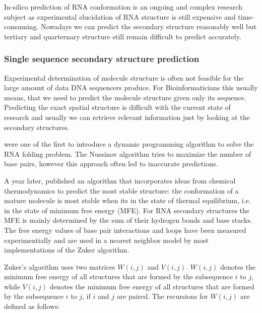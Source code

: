 In-silico prediction of RNA conformation is an ongoing and complex research subject as experimental elucidation of RNA structure is still expensive and time-consuming. Nowadays we can predict the secondary structure reasonably well but tertiary and quarternary structure still remain difficult to predict accurately.

\subsubsection{Single sequence secondary structure prediction}
Experimental determination of molecule structure is often not feasible for the large amount of data DNA sequencers produce. For Bioinformaticians
this usually means, that we need to predict the molecule structure given only its sequence. Predicting the exact spatial structure is difficult with the current state of research and usually we can retrieve relevant information just by looking at the secondary structures. 

\citeauthor{pmid6163133} were one of the first to introduce a dynamic programming algorithm to solve the RNA folding problem. The Nussinov algorithm tries to maximize the number of base pairs, however this approach often led to inaccurate predictions.   

A year later, \citeauthor{pmid6163133} published an algorithm that incorporates ideas from chemical thermodynamics to predict the most stable structure: the conformation of a mature molecule is most stable when its in the state of thermal equilibrium, i.e. in the state of minimum free energy (MFE). For RNA secondary structures the MFE is mainly determined by the sum of their hydrogen bonds and base stacks. The free energy values of base pair interactions and loops have been measured experimentially and are used in a nearest neighbor model by most implementations of the Zuker algorithm.  

Zuker's algorithm uses two matrices $W(i,j)$ and $V(i,j)$. $W(i,j)$ denotes the minimum free energy of all structures that are formed by the subsequence $i$ to $j$, while $V(i,j)$ denotes the minimum free energy of all structures that are formed by the subsequence $i$ to $j$, if $i$ and $j$ are paired. The recursions for $W(i,j)$ are defined as follows:


